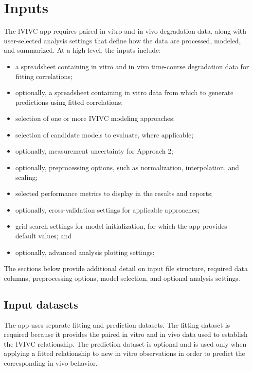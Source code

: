 \section{Inputs}

The IVIVC app requires paired in vitro and in vivo degradation data, along with user-selected analysis settings that define how the data are processed, modeled, and summarized. At a high level, the inputs include:

\begin{itemize}
\item a spreadsheet containing in vitro and in vivo time-course degradation data for fitting correlations;
\item optionally, a spreadsheet containing in vitro data from which to generate predictions using fitted correlations;
\item selection of one or more IVIVC modeling approaches;
\item selection of candidate models to evaluate, where applicable;
\item optionally, measurement uncertainty for Approach 2;
\item optionally, preprocessing options, such as normalization, interpolation, and scaling;
\item selected performance metrics to display in the results and reports;
\item optionally, cross-validation settings for applicable approaches;
\item grid-search settings for model initialization, for which the app provides default values; and
\item optionally, advanced analysis plotting settings;
\end{itemize}

The sections below provide additional detail on input file structure, required data columns, preprocessing options, model selection, and optional analysis settings.

\subsection{Input datasets}

The app uses separate fitting and prediction datasets. The fitting dataset is required because it provides the paired in vitro and in vivo data used to establish the IVIVC relationship. The prediction dataset is optional and is used only when applying a fitted relationship to new in vitro observations in order to predict the corresponding in vivo behavior.

